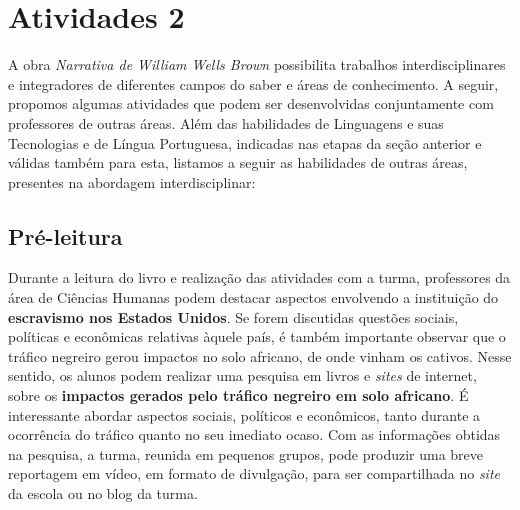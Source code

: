 \documentclass[11pt]{extarticle}
\begin{document}
\section{Atividades 2}



A obra \emph{Narrativa de William Wells Brown} possibilita trabalhos
interdisciplinares e integradores de diferentes campos do saber e áreas
de conhecimento. A seguir, propomos algumas atividades que podem ser
desenvolvidas conjuntamente com professores de outras áreas. Além das
habilidades de Linguagens e suas Tecnologias e de Língua Portuguesa,
indicadas nas etapas da seção anterior e válidas também para esta,
listamos a seguir as habilidades de outras áreas, presentes na abordagem
interdisciplinar:

\subsection{Pré-leitura}


Durante a leitura do livro e realização das atividades com a
turma, professores da área de Ciências Humanas podem destacar aspectos
envolvendo a instituição do \textbf{escravismo nos Estados Unidos}. Se
forem discutidas questões sociais, políticas e econômicas relativas
àquele país, é também importante observar que o tráfico negreiro gerou
impactos no solo africano, de onde vinham os cativos. Nesse sentido, os
alunos podem realizar uma pesquisa em livros e \emph{sites} de internet,
sobre os \textbf{impactos gerados pelo tráfico negreiro em solo
africano}. É interessante abordar aspectos sociais, políticos e
econômicos, tanto durante a ocorrência do tráfico quanto no seu imediato
ocaso. Com as informações obtidas na pesquisa, a turma, reunida em
pequenos grupos, pode produzir uma breve reportagem em vídeo, em formato
de divulgação, para ser compartilhada no \emph{site} da escola ou no
blog da turma.
\end{document}
